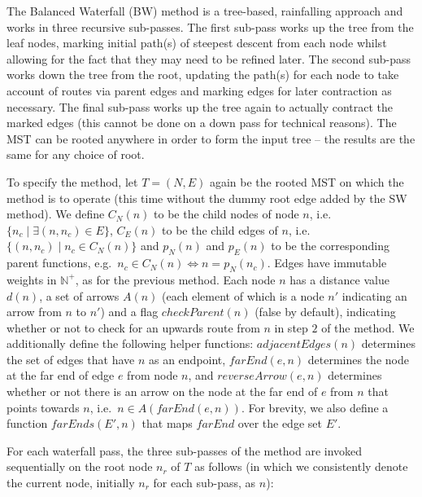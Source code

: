\documentclass[preprint,a4paper]{elsarticle}
\begin{document}
The Balanced Waterfall (BW) method is a tree-based, rainfalling approach and works in three recursive sub-passes. The first sub-pass works up the tree from the leaf nodes, marking initial path(s) of steepest descent from each node whilst allowing for the fact that they may need to be refined later. The second sub-pass works down the tree from the root, updating the path(s) for each node to take account of routes via parent edges and marking edges for later contraction as necessary. The final sub-pass works up the tree again to actually contract the marked edges (this cannot be done on a down pass for technical reasons). The MST can be rooted anywhere in order to form the input tree -- the results are the same for any choice of root.

To specify the method, let $T = (N,E)$ again be the rooted MST on which the method is to operate (this time without the dummy root edge added by the SW method). We define $C_N(n)$ to be the child nodes of node $n$, i.e.~$\{n_c \; | \; \exists (n,n_c) \in E\}$, $C_E(n)$ to be the child edges of $n$, i.e.~$\{(n,n_c) \; | \; n_c \in C_N(n)\}$ and $p_N(n)$ and $p_E(n)$ to be the corresponding parent functions, e.g.~$n_c \in C_N(n) \Leftrightarrow n = p_N(n_c)$. Edges have immutable weights in $\mathbb{N}^+$, as for the previous method. Each node $n$ has a distance value $d(n)$, a set of arrows $A(n)$ (each element of which is a node $n'$ indicating an arrow from $n$ to $n'$) and a flag $checkParent(n)$ (false by default), indicating whether or not to check for an upwards route from $n$ in step $2$ of the method. We additionally define the following helper functions: $adjacentEdges(n)$ determines the set of edges that have $n$ as an endpoint, $farEnd(e,n)$ determines the node at the far end of edge $e$ from node $n$, and $reverseArrow(e,n)$ determines whether or not there is an arrow on the node at the far end of $e$ from $n$ that points towards $n$, i.e.~$n \in A(farEnd(e,n))$. For brevity, we also define a function $farEnds(E',n)$ that maps $farEnd$ over the edge set $E'$.

For each waterfall pass, the three sub-passes of the method are invoked sequentially on the root node $n_r$ of $T$ as follows (in which we consistently denote the current node, initially $n_r$ for each sub-pass, as $n$):
\end{document}
